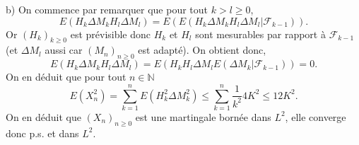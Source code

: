\documentclass[a4, 12pt]{article}
\providecommand{\N}{\mathbb{N}}
\begin{document}
b) On commence par remarquer que pour tout $k>l\geq 0$,
\begin{equation*}
E(H_k\Delta M_kH_l\Delta M_l)=E(E(H_k\Delta M_kH_l\Delta M_l|\mathcal{F}_{k-1})).
\end{equation*}
Or $(H_k)_{k\geq 0}$ est prévisible donc $H_k$ et $H_l$ sont mesurables par rapport à $\mathcal{F}_{k-1}$ (et $\Delta M_l$ aussi car $(M_n)_{n\geq 0}$ est adapté). On obtient donc,
\begin{equation*}
E(H_k\Delta M_kH_l\Delta M_l)=E(H_kH_l\Delta M_lE(\Delta M_k|\mathcal{F}_{k-1}))=0.
\end{equation*}
On en déduit que pour tout $n\in\N$
\begin{equation*}
E(X_n^2)=\sum_{k=1}^nE(H_k^2\Delta M_k^2)\leq \sum_{k=1}^n \frac{1}{k^2}4K^2\leq  12 K^2.
\end{equation*}
On en déduit que $(X_n)_{n\geq 0}$ est une martingale bornée dans $L^2$, elle converge donc p.s. et dans $L^2$.
\end{document}
